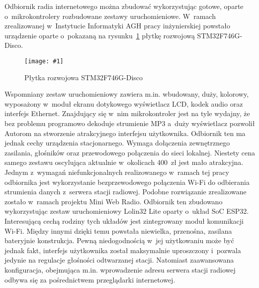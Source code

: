 \documentclass[polish]{aghengthesis}
\newcommand{\imgint}[4]{
	\begin{figure}[{#4}]
		\centering
		\texttt{[image: \#1]}
		\caption{#2}
		\label{#1}
	\end{figure}
}
\newcommand{\imgh}[3]{\imgint{#1}{#2}{#3}{H}}
\begin{document}
		Odbiornik radia internetowego można zbudować wykorzystując gotowe, oparte o~mikrokontrolery rozbudowane zestawy uruchomieniowe. W~ramach zrealizowanej w~Instytucie Informatyki AGH pracy inżynierskiej\textsuperscript{\cite{apd_radio2}} powstało urządzenie oparte o~pokazaną na rysunku~\ref{1/botland_stm} płytkę rozwojową STM32F746G-Disco\textsuperscript{\cite{stm32_disco}}.
		
		\imgh{1/botland_stm}{Płytka rozwojowa STM32F746G-Disco\textsuperscript{\cite{botland_stm}}}{0.6}
		
		Wspomniany zestaw uruchomieniowy zawiera m.in. wbudowany, duży, kolorowy, wyposażony w~moduł ekranu dotykowego wyświetlacz LCD, kodek audio oraz interfejs Ethernet. Znajdujący się w~nim mikrokontroler jest na tyle wydajny, że bez problemu programowo dekoduje strumienie MP3 a~duży wyświetlacz pozwolił Autorom na stworzenie atrakcyjnego interfejsu użytkownika. Odbiornik ten ma jednak cechy urządzenia stacjonarnego. Wymaga dołączenia zewnętrznego zasilania, głośników oraz przewodowego połączenia do sieci lokalnej. Niestety cena samego zestawu oscylująca aktualnie w~okolicach 400~zł jest mało atrakcyjna.
		$ $\\
		
		Jednym z~wymagań niefunkcjonalnych realizowanego w~ramach tej pracy odbiornika jest wykorzystanie bezprzewodowego połączenia Wi-Fi do odbierania strumienia danych z~serwera stacji radiowej. Podobne rozwiązanie zrealizowane zostało w~ramach projektu Mini Web Radio\textsuperscript{\cite{esp32_radio}}. Odbiornik ten zbudowano wykorzystując zestaw uruchomieniowy Lolin32 Lite oparty o~układ SoC ESP32. Interesującą cechą rodziny tych układów jest zintegrowany moduł komunikacji Wi-Fi. Między innymi dzięki temu powstała niewielka, przenośna, zasilana bateryjnie konstrukcja. Pewną niedogodnością w~jej użytkowaniu może być jednak fakt, interfejs użytkownika został maksymalnie uproszczony i~pozwala jedynie na regulacje głośności odtwarzanej stacji. Natomiast zaawansowana konfiguracja, obejmująca m.in. wprowadzenie adresu serwera stacji radiowej odbywa się za pośrednictwem przeglądarki internetowej.
		
	
\end{document}
